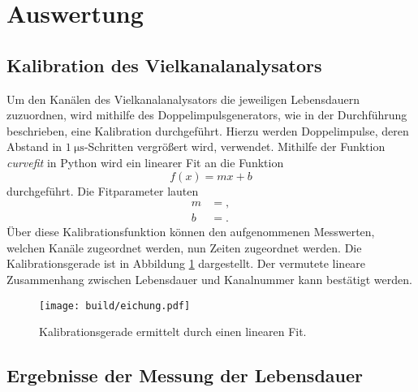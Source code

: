\section{Auswertung}
\label{sec:Auswertung}

\subsection{Kalibration des Vielkanalanalysators}

Um den Kanälen des Vielkanalanalysators die jeweiligen Lebensdauern zuzuordnen, wird mithilfe des Doppelimpulsgenerators, wie in der Durchführung beschrieben, eine Kalibration durchgeführt.
Hierzu werden Doppelimpulse, deren Abstand in $\SI{1}{\micro\second}$-Schritten vergrößert wird, verwendet.
Mithilfe der Funktion \emph{curvefit} in Python \cite{scipy} wird ein linearer Fit an die Funktion
\begin{equation}
  f(x) = mx + b \label{linfit}
\end{equation}
durchgeführt.
Die Fitparameter lauten
\begin{align*}
  m &= ,\\
  b &= .
\end{align*}
Über diese Kalibrationsfunktion können den aufgenommenen Messwerten, welchen Kanäle zugeordnet werden, nun Zeiten zugeordnet werden.
Die Kalibrationsgerade ist in Abbildung \ref{plot:kali} dargestellt.
Der vermutete lineare Zusammenhang zwischen Lebensdauer und Kanalnummer kann bestätigt werden.

\begin{figure}
  \centering
  \texttt{[image: build/eichung.pdf]}
  \caption{Kalibrationsgerade ermittelt durch einen linearen Fit.}
  \label{plot:kali}
\end{figure}

\subsection{Ergebnisse der Messung der Lebensdauer}

